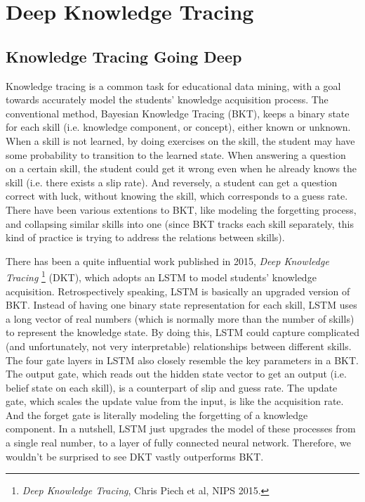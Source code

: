 \section{Deep Knowledge Tracing}
\label{sec:DKT}

\subsection{Knowledge Tracing Going Deep}

Knowledge tracing is a common task for educational data mining, with a goal towards accurately model the students' knowledge acquisition process. The conventional method, Bayesian Knowledge Tracing (BKT), keeps a binary state for each skill (i.e. knowledge component, or concept), either known or unknown. When a skill is not learned, by doing exercises on the skill, the student may have some probability to transition to the learned state. When answering a question on a certain skill, the student could get it wrong even when he already knows the skill (i.e. there exists a slip rate). And reversely, a student can get a question correct with luck, without knowing the skill, which corresponds to a guess rate. There have been various extentions to BKT, like modeling the forgetting process, and collapsing similar skills into one (since BKT tracks each skill separately, this kind of practice is trying to address the relations between skills).

There has been a quite influential work published in 2015, \textit{Deep Knowledge Tracing} \footnote{\textit{Deep Knowledge Tracing}, Chris Piech et al, NIPS 2015.} (DKT), which adopts an LSTM to model students' knowledge acquisition. Retrospectively speaking, LSTM is basically an upgraded version of BKT. Instead of having one binary state representation for each skill, LSTM uses a long vector of real numbers (which is normally more than the number of skills) to represent the knowledge state. By doing this, LSTM could capture complicated (and unfortunately, not very interpretable) relationships between different skills. The four gate layers in LSTM also closely resemble the key parameters in a BKT. The output gate, which reads out the hidden state vector to get an output (i.e. belief state on each skill), is a counterpart of slip and guess rate. The update gate, which scales the update value from the input, is like the acquisition rate. And the forget gate is literally modeling the forgetting of a knowledge component. In a nutshell, LSTM just upgrades the model of these processes from a single real number, to a layer of fully connected neural network. Therefore, we wouldn't be surprised to see DKT vastly outperforms BKT.

